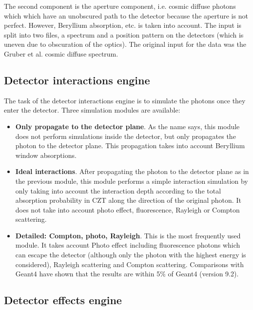 The second component is the aperture component, i.e. cosmic diffuse photons which which have an unobscured path to the detector because the aperture is not perfect. However, Beryllium absorption, etc. is taken into account. The input is split into two files, a spectrum and a position pattern on the detectors (which is uneven due to obscuration of the optics). The original input for the data was the Gruber et al. cosmic diffuse spectrum.


\subsection{Detector interactions engine}

The task of the detector interactions engine is to simulate the photons once they enter the detector.
Three simulation modules are available:
\begin{itemize}
 \item \textbf{Only propagate to the detector plane}.
As the name says, this module does not perform simulations inside the detector, but only propagates the photon to the detector plane. This propagation takes into account Beryllium window absorptions.
 \item \textbf{Ideal interactions}.
After propagating the photon to the detector plane as in the previous module, this module performs a simple interaction simulation by only taking into account the interaction depth according to the total absorption probability in CZT along the direction of the original photon. It does not take into account photo effect, fluorescence, Rayleigh or Compton scattering.
 \item \textbf{Detailed: Compton, photo, Rayleigh}.
This is the most frequently used module. It takes account Photo effect including fluorescence photons which can escape the detector (although only the photon with the highest energy is considered), Rayleigh scattering and Compton scattering. Comparisons with Geant4 have shown that the results are within 5\% of Geant4 (version 9.2).
\end{itemize}

\subsection{Detector effects engine}


